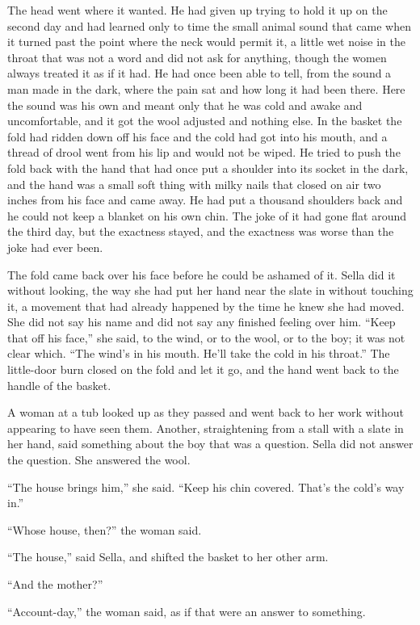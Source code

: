 The head went where it wanted. He had given up trying to hold it up on the second day and had learned only to time the small animal sound that came when it turned past the point where the neck would permit it, a little wet noise in the throat that was not a word and did not ask for anything, though the women always treated it as if it had. He had once been able to tell, from the sound a man made in the dark, where the pain sat and how long it had been there. Here the sound was his own and meant only that he was cold and awake and uncomfortable, and it got the wool adjusted and nothing else. In the basket the fold had ridden down off his face and the cold had got into his mouth, and a thread of drool went from his lip and would not be wiped. He tried to push the fold back with the hand that had once put a shoulder into its socket in the dark, and the hand was a small soft thing with milky nails that closed on air two inches from his face and came away. He had put a thousand shoulders back and he could not keep a blanket on his own chin. The joke of it had gone flat around the third day, but the exactness stayed, and the exactness was worse than the joke had ever been.

The fold came back over his face before he could be ashamed of it. Sella did it without looking, the way she had put her hand near the slate in  without touching it, a movement that had already happened by the time he knew she had moved. She did not say his name and did not say any finished feeling over him. “Keep that off his face,” she said, to the wind, or to the wool, or to the boy; it was not clear which. “The wind's in his mouth. He'll take the cold in his throat.” The little-door burn closed on the fold and let it go, and the hand went back to the handle of the basket.

A woman at a tub looked up as they passed and went back to her work without appearing to have seen them. Another, straightening from a stall with a slate in her hand, said something about the boy that was a question. Sella did not answer the question. She answered the wool.

“The house brings him,” she said. “Keep his chin covered. That's the cold's way in.”

“Whose house, then?” the woman said.

“The house,” said Sella, and shifted the basket to her other arm.

“And the mother?”

“Account-day,” the woman said, as if that were an answer to something.

